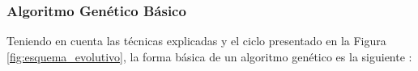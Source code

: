 \begin{enumerate}

\end{enumerate}
\subsubsection{Algoritmo  Genético Básico}
Teniendo en cuenta las técnicas explicadas y el ciclo presentado en la Figura \ref{fig:esquema_evolutivo}, la forma básica de un algoritmo genético es la siguiente \cite{grosan2011intelligent}: 

